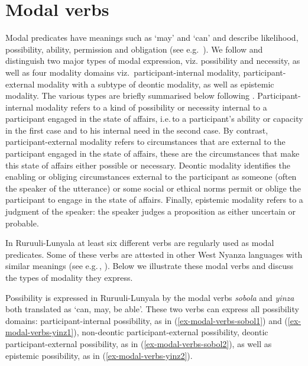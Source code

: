 \section{Modal verbs}\label{sec-modal-verbs}

Modal predicates have meanings such as ‘may’ and ‘can’ and describe likelihood, possibility, ability, permission and obligation (see e.g.\, \citealt[33]{Palmer2001Mood}). We follow \citet{vanderAuweraetal1998Modality} and distinguish two major types of modal expression, viz. possibility and necessity, as well as four modality domains viz.\, participant-internal modality, par\-ti\-ci\-pant-external modality with a subtype of deontic modality, as well as epistemic modality. The various types are briefly summarised below following \citet[80–81]{vanderAuweraetal1998Modality}. 
Participant-internal modality refers to a kind of possibility or necessity internal to a participant engaged in the state of affairs, i.e.\,to a participant’s ability or capacity in the first case and to his internal need in the second case. 
By contrast, par\-ti\-ci\-pant-external modality refers to circumstances that are external to the participant engaged in the state of affairs, these are the circumstances that make this state of affairs either possible or necessary. 
Deontic modality identifies the enabling or obliging circumstances external to the participant as someone (often the speaker of the utterance) or some social or ethical norms permit or oblige the participant to engage in the state of affairs. 
Finally, epistemic modality refers to a judgment of the speaker: the speaker judges a proposition as either uncertain or probable.

In Ru\-ruu\-li\hyp{}Lu\-nya\-la at least six different verbs are regularly used as modal predicates. 
Some of these verbs are attested in other West Nyanza languages with similar meanings (see e.g.\,\citealt[313]{Nabirye2016Corpus-based}, \citealt{Kawalyaetal2018Reconstructing}). Below we illustrate these modal verbs and discuss the types of modality they express.

Possibility is expressed in Ru\-ruu\-li\hyp{}Lu\-nya\-la by the modal verbs \emph{sobola} and \emph{yinza} both translated as ‘can, may, be able’. 
These two verbs can express all possibility domains: parti\-ci\-pant-internal possibility, as in (\ref{ex-modal-verbs-sobol1}) and (\ref{ex-modal-verbs-yinz1}), non-deontic parti\-ci\-pant-external possibility, deontic parti\-ci\-pant-external possibility, as in (\ref{ex-modal-verbs-sobol2}), as well as epistemic possibility, as in (\ref{ex-modal-verbs-yinz2}).

